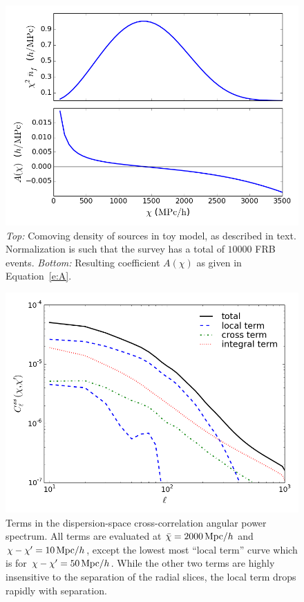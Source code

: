 \documentclass[twocolumn,prl,nofootinbib,floatfix]{revtex4-1}
\begin{document}
\begin{figure}
    \includegraphics[scale=0.42]{figures/n_f}
    \caption{
        \label{f:n_f}
        \emph{Top:} Comoving density of sources in toy model, as described in
        text. Normalization is
        such that the survey has a total of $10000$ FRB events.
        \emph{Bottom:} Resulting coefficient $A(\chi)$ as given in
        Equation~\ref{e:A}.
    }
\end{figure}

\begin{figure}
    \includegraphics[scale=0.42]{figures/terms}
    \caption{
        \label{f:terms}
        Terms in the dispersion-space cross-correlation angular power spectrum.
        All terms are evaluated at $\bar\chi=2000\,{\rm Mpc}/h$ and 
        $\chi - \chi' = 10\,{\rm Mpc}/h$, except the lowest most 
        ``local term'' curve which is for $\chi - \chi'=50\,{\rm Mpc}/h$. 
        While
        the other two terms are highly insensitive to the separation of
        the radial slices, the local term drops rapidly with separation.
    }
\end{figure}
\end{document}
